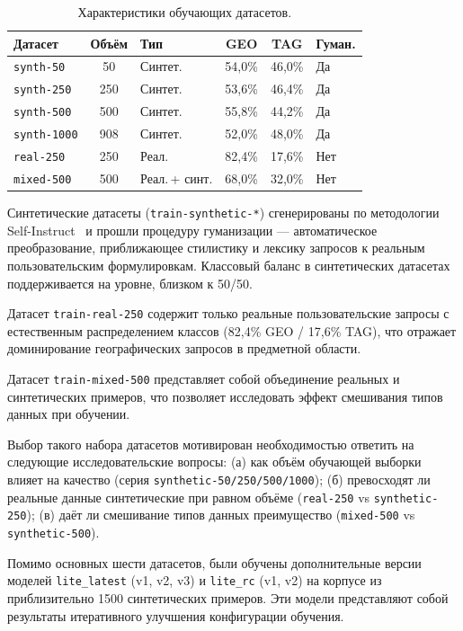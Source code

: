 \begin{table}[H]
\centering
\caption{Характеристики обучающих датасетов.}
\label{tab:datasets}
\def\arraystretch{1.2}
\setlength\tabcolsep{0.35em}
\begin{tabular}{lclccl}
    \toprule
    Датасет & Объём & Тип & GEO & TAG & Гуман. \\
    \midrule
    \texttt{synth-50}   & 50  & Синтет.       & 54,0\% & 46,0\% & Да \\
    \texttt{synth-250}  & 250 & Синтет.       & 53,6\% & 46,4\% & Да \\
    \texttt{synth-500}  & 500 & Синтет.       & 55,8\% & 44,2\% & Да \\
    \texttt{synth-1000} & 908 & Синтет.       & 52,0\% & 48,0\% & Да \\
    \texttt{real-250}   & 250 & Реал.         & 82,4\% & 17,6\% & Нет \\
    \texttt{mixed-500}  & 500 & Реал.\,+ синт. & 68,0\% & 32,0\% & Нет \\
    \bottomrule
\end{tabular}
\end{table}

Синтетические датасеты (\texttt{train-synthetic-*}) сгенерированы по методологии Self-Instruct~\cite{wang2023selfinstruct} и прошли процедуру гуманизации --- автоматическое преобразование, приближающее стилистику и лексику запросов к реальным пользовательским формулировкам. Классовый баланс в синтетических датасетах поддерживается на уровне, близком к 50/50.

Датасет \texttt{train-real-250} содержит только реальные пользовательские запросы с естественным распределением классов (82,4\% GEO / 17,6\% TAG), что отражает доминирование географических запросов в предметной области.

Датасет \texttt{train-mixed-500} представляет собой объединение реальных и синтетических примеров, что позволяет исследовать эффект смешивания типов данных при обучении.

Выбор такого набора датасетов мотивирован необходимостью ответить на следующие исследовательские вопросы: (а) как объём обучающей выборки влияет на качество (серия \texttt{synthetic-50/250/500/1000}); (б) превосходят ли реальные данные синтетические при равном объёме (\texttt{real-250} vs \texttt{synthetic-250}); (в) даёт ли смешивание типов данных преимущество (\texttt{mixed-500} vs \texttt{synthetic-500}).

Помимо основных шести датасетов, были обучены дополнительные версии моделей \texttt{lite\_latest} (v1, v2, v3) и \texttt{lite\_rc} (v1, v2) на корпусе из приблизительно 1500 синтетических примеров. Эти модели представляют собой результаты итеративного улучшения конфигурации обучения.


